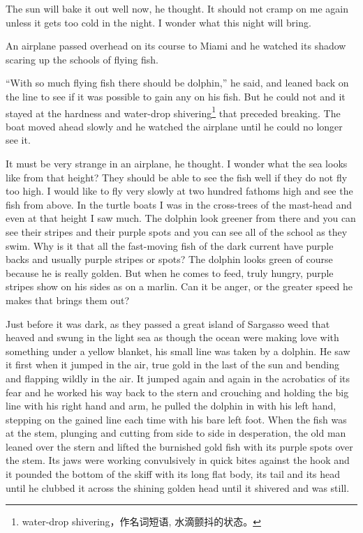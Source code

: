 \documentclass[fontset=ubuntu]{ctexrep}
\newlength{\drop}%
\begin{document}
The sun will \gls{bake} it out well now, he thought. It
should not cramp on me again unless it gets too cold in the night. I wonder
what this night will bring.

An airplane passed overhead on its course to Miami and he watched its shadow
scaring up the schools of flying fish.

``With so much flying fish there should be dolphin,'' he said, and leaned
back on the line to see if it was possible to gain any on his fish. But he
could not and it stayed at the \gls{hardness} and water-drop
shivering\footnote{water-drop shivering，作名词短语, 水滴颤抖的状态。} that
\gls{preceded} breaking. The boat moved ahead slowly and he watched the
airplane until he could no longer see it.

It must be very strange in an airplane, he thought. I wonder what the sea
looks like from that height? They should be able to see the fish well if
they do not fly too high. I would like to fly very slowly at two hundred
fathoms high and see the fish from above. In the turtle boats I was in the
cross-trees of the mast-head and even at that height I saw much. The dolphin
look greener from there and you can see their stripes and their purple \glspl{spot}
and you can see all of the school as they swim. Why is it that all the
fast-moving fish of the dark current have purple backs and usually purple
stripes or spots? The dolphin looks green of course because he is really
golden. But when he comes to feed, truly hungry, purple stripes show on his
sides as on a marlin. Can it be \gls{anger}, or the greater speed he makes
that brings them out?

Just before it was dark, as they passed a great island of Sargasso weed that
\gls{heaved} and swung in the light sea as though the ocean were making love
with something under a yellow blanket, his small line was taken by a
dolphin. He saw it first when it jumped in the air, true gold in the last of
the sun and \gls{bending} and \gls{flapping} wildly in the air. It jumped
again and again in the \gls{acrobatics} of its \gls{fear} and he worked his
way back to the stern and \gls{crouching} and holding the big line with his
right hand and arm, he pulled the dolphin in with his left hand, stepping on
the gained line each time with his bare left foot. When the fish was at the
\gls{stem}, \gls{plunging} and cutting from side to side in
\gls{desperation}, the old man leaned over the stern and lifted the
\gls{burnished} gold fish with its purple spots over the stem. Its
\glspl{jaw} were working \gls{convulsively} in quick bites against the hook
and it pounded the bottom of the skiff with its long flat body, its tail and
its head until he \gls{clubbed} it across the shining golden head until it
shivered and was still.
\end{document}

